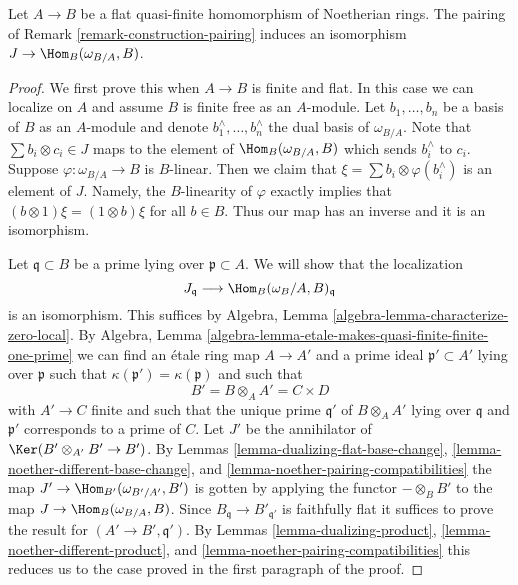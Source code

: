 \begin{lemma}
\label{lemma-noether-pairing-flat-quasi-finite}
Let $A \to B$ be a flat quasi-finite homomorphism of Noetherian rings.
The pairing of Remark \ref{remark-construction-pairing} induces an isomorphism
$J \to \Hom_B(\omega_{B/A}, B)$.
\end{lemma}

\begin{proof}
We first prove this when $A \to B$ is finite and flat. In this case we can
localize on $A$ and assume $B$ is finite free as an $A$-module. Let
$b_1, \ldots, b_n$ be a basis of $B$ as an $A$-module and denote
$b_1^\wedge, \ldots, b_n^\wedge$ the dual basis of $\omega_{B/A}$. Note that
$\sum b_i \otimes c_i \in J$ maps to the element of $\Hom_B(\omega_{B/A}, B)$
which sends $b_i^\wedge$ to $c_i$. Suppose $\varphi : \omega_{B/A} \to B$
is $B$-linear. Then we claim that $\xi = \sum b_i \otimes \varphi(b_i^\wedge)$
is an element of $J$. Namely, the $B$-linearity of $\varphi$
exactly implies that $(b \otimes 1)\xi = (1 \otimes b)\xi$ for all $b \in B$.
Thus our map has an inverse and it is an isomorphism.

\medskip\noindent
Let $\mathfrak q \subset B$ be a prime lying over $\mathfrak p \subset A$.
We will show that the localization
$$
J_\mathfrak q
\longrightarrow
\Hom_B(\omega_B/A, B)_\mathfrak q
$$
is an isomorphism.
This suffices by Algebra, Lemma \ref{algebra-lemma-characterize-zero-local}.
By
Algebra, Lemma \ref{algebra-lemma-etale-makes-quasi-finite-finite-one-prime}
we can find an \'etale ring map $A \to A'$ and a prime
ideal $\mathfrak p' \subset A'$ lying over $\mathfrak p$
such that $\kappa(\mathfrak p') = \kappa(\mathfrak p)$ and
such that
$$
B' = B \otimes_A A' = C \times D
$$
with $A' \to C$ finite and such that the unique prime $\mathfrak q'$
of $B \otimes_A A'$ lying over $\mathfrak q$ and $\mathfrak p'$
corresponds to a prime of $C$. Let $J'$ be the annihilator of
$\Ker(B' \otimes_{A'} B' \to B')$. By
Lemmas \ref{lemma-dualizing-flat-base-change},
\ref{lemma-noether-different-base-change}, and
\ref{lemma-noether-pairing-compatibilities}
the map $J' \to \Hom_{B'}(\omega_{B'/A'}, B')$
is gotten by applying the functor $- \otimes_B B'$
to the map $J \to \Hom_B(\omega_{B/A}, B)$.
Since $B_\mathfrak q \to B'_{\mathfrak q'}$ is faithfully flat
it suffices to prove the result for $(A' \to B', \mathfrak q')$.
By Lemmas \ref{lemma-dualizing-product},
\ref{lemma-noether-different-product}, and
\ref{lemma-noether-pairing-compatibilities}
this reduces us to the case proved in the first
paragraph of the proof.
\end{proof}

